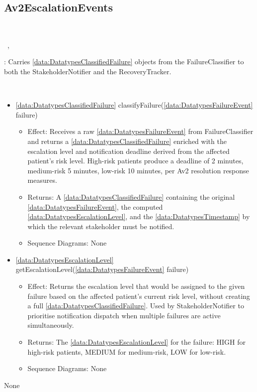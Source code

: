   \subsection{Av2EscalationEvents}\label{int:InterfacesAv2EscalationEvents}
    \begin{description}
      \item[Provided by:] \iconcomponent{}~
      \item[Required by:] \iconcomponent{}~, \iconcomponent{}~ 
           \item[Description]: Carries \ref{data:DatatypesClassifiedFailure} objects from the FailureClassifier to both the StakeholderNotifier and the RecoveryTracker.
      \item[Operations:] ~
    \begin{itemize}[noitemsep,nolistsep,leftmargin=-.25cm]
      \item \textsf{\ref{data:DatatypesClassifiedFailure} classifyFailure(\ref{data:DatatypesFailureEvent} failure)}
        \begin{itemize}[noitemsep,nolistsep]
           \item Effect: Receives a raw \ref{data:DatatypesFailureEvent} from FailureClassifier and returns a \ref{data:DatatypesClassifiedFailure} enriched with the escalation level and notification deadline derived from the affected patient's risk level. High-risk patients produce a deadline of 2 minutes, medium-risk 5 minutes, low-risk 10 minutes, per Av2 resolution response measures. 
           \item Returns: A \ref{data:DatatypesClassifiedFailure} containing the original \ref{data:DatatypesFailureEvent}, the computed \ref{data:DatatypesEscalationLevel}, and the \ref{data:DatatypesTimestamp} by which the relevant stakeholder must be notified.
           \item Sequence Diagrams: None
        \end{itemize}
      \item \textsf{\ref{data:DatatypesEscalationLevel} getEscalationLevel(\ref{data:DatatypesFailureEvent} failure)}
        \begin{itemize}[noitemsep,nolistsep]
           \item Effect: Returns the escalation level that would be assigned to the given failure based on the affected patient's current risk level, without creating a full \ref{data:DatatypesClassifiedFailure}. Used by StakeholderNotifier to prioritise notification dispatch when multiple failures are active simultaneously. 
           \item Returns: The \ref{data:DatatypesEscalationLevel} for the failure: HIGH for high-risk patients, MEDIUM for medium-risk, LOW for low-risk.
           \item Sequence Diagrams: None
        \end{itemize}
    \end{itemize}
      \item[Diagrams:] None
    \end{description}

